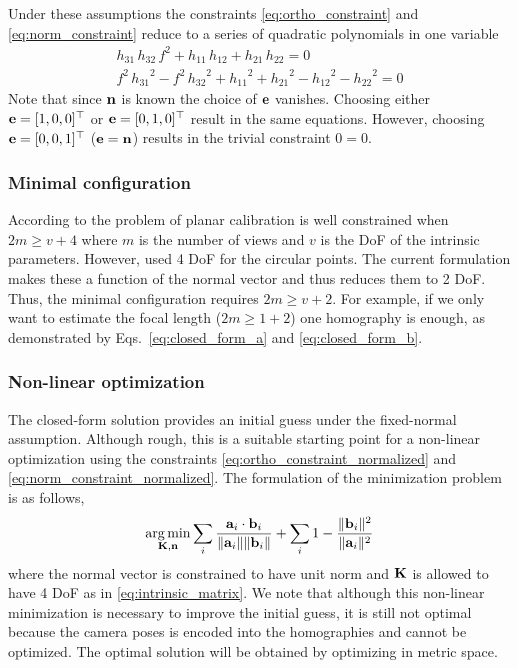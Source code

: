 \documentclass[10pt,twocolumn,letterpaper]{article}
\begin{document}
Under these assumptions the constraints \eqref{eq:ortho_constraint} and \eqref{eq:norm_constraint} reduce to a series of quadratic polynomials in one variable 
\begin{align}
h_{31}\, h_{32}\, f^2 + h_{11}\, h_{12} + h_{21}\, h_{22}=0
\label{eq:closed_form_a}
\\
f^2\, {h_{31}}^2 - f^2\, {h_{32}}^2 + {h_{11}}^2 + {h_{21}}^2 - {h_{12}}^2 - {h_{22}}^2=0
\label{eq:closed_form_b}
\end{align}
Note that since $\mathbf{n}$ is known the choice of $\mathbf{e}$ vanishes. Choosing either $\mathbf{e}=[1,0,0]^\top$ or $\mathbf{e}=[0,1,0]^\top$ result in the same equations. However, choosing $\mathbf{e}=[0,0,1]^\top$ (\ie $\mathbf{e}=\mathbf{n}$) results in the trivial constraint $0=0$.

\subsubsection{Minimal configuration}

According to \cite{hartley2000} the problem of planar calibration is well constrained when $2m \geq v+4$ where $m$ is the number of views and $v$ is the DoF of the intrinsic parameters. However, \cite{hartley2000} used 4 DoF for the circular points. The current formulation makes these a function of the normal vector and thus reduces them to 2 DoF. Thus, the minimal configuration requires $2m \geq v+2$. For example, if we only want to estimate the focal length ($2m \geq 1+2$) one homography is enough, as demonstrated by Eqs.~\eqref{eq:closed_form_a} and \eqref{eq:closed_form_b}.

\subsubsection{Non-linear optimization}

The closed-form solution provides an initial guess under the fixed-normal assumption. Although rough, this is a suitable starting point for a non-linear optimization using the constraints \eqref{eq:ortho_constraint_normalized} and \eqref{eq:norm_constraint_normalized}. The formulation of the minimization problem is as follows, 
%
\begin{align}
\operatorname*{arg\,min}_{\mathbf{K},\mathbf{n}} 
\sum_i 
\frac{\mathbf{a}_i \cdot \mathbf{b}_i}{\lVert\mathbf{a}_i\rVert \lVert\mathbf{b}_i\rVert} +
\sum_i 
1 - \frac{\lVert\mathbf{b}_i\rVert^2}{\lVert\mathbf{a}_i\rVert^2}
\end{align}
%
where the normal vector is constrained to have unit norm and $\mathbf{K}$ is allowed to have 4 DoF as in \eqref{eq:intrinsic_matrix}. We note that although this non-linear minimization is necessary to improve the initial guess, it is still not optimal because the camera poses is encoded into the homographies and cannot be optimized. The optimal solution will be obtained by optimizing in metric space.
\end{document}
